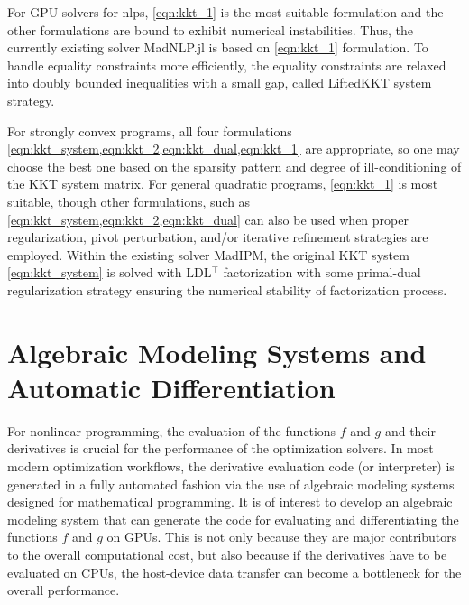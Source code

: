 \documentclass{article}
\begin{document}
For GPU solvers for \glspl*{nlp}, \cref{eqn:kkt_1} is the most suitable formulation and the other formulations are bound to exhibit numerical instabilities. Thus, the currently existing solver MadNLP.jl is based on \cref{eqn:kkt_1} formulation. To handle equality constraints more efficiently, the equality constraints are relaxed into doubly bounded inequalities with a small gap, called LiftedKKT system strategy.

For strongly convex programs, all four formulations \cref{eqn:kkt_system,eqn:kkt_2,eqn:kkt_dual,eqn:kkt_1} are appropriate, so one may choose the best one based on the sparsity pattern and degree of ill-conditioning of the KKT system matrix. For general quadratic programs, \cref{eqn:kkt_1} is most suitable, though other formulations, such as \cref{eqn:kkt_system,eqn:kkt_2,eqn:kkt_dual} can also be used when proper regularization, pivot perturbation, and/or iterative refinement strategies are employed. Within the existing solver MadIPM, the original KKT system \cref{eqn:kkt_system} is solved with LDL$^\top$ factorization with some primal-dual regularization strategy ensuring the numerical stability of factorization process.





\section{Algebraic Modeling Systems and Automatic Differentiation}\label{eqn:ad}
For nonlinear programming, the evaluation of the functions $f$ and $g$ and their derivatives is crucial for the performance of the optimization solvers.
In most modern optimization workflows, the derivative evaluation code (or interpreter) is generated in a fully automated fashion via the use of algebraic modeling systems designed for mathematical programming.
It is of interest to develop an algebraic modeling system that can generate the code for evaluating and differentiating the functions $f$ and $g$ on GPUs.
This is not only because they are major contributors to the overall computational cost, but also because if the derivatives have to be evaluated on CPUs, the host-device data transfer can become a bottleneck for the overall performance.
\end{document}

